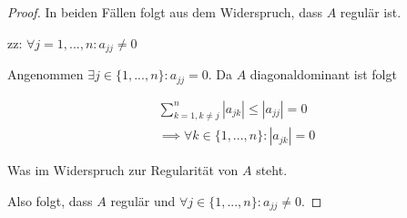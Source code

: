 \documentclass[]{article}
\begin{document}
\begin{proof}
	In beiden Fällen folgt aus dem Widerspruch, dass $A$ regulär ist.
	
	zz: $\forall j=1, ..., n: a_{jj}\neq 0$
	
	Angenommen $\exists j\in \{1, ..., n\}: a_{jj} = 0$. Da $A$ diagonaldominant ist folgt
	
	\begin{align*}
		\sum_{k=1,k\neq j}^{n}|a_{jk}| \leq |a_{jj}| = 0\\
		\implies \forall k\in\{1, ..., n\}: |a_{jk}| = 0
	\end{align*}

	Was im Widerspruch zur Regularität von $A$ steht.
	
	Also folgt, dass $A$ regulär und $\forall j\in\{1,...,n\}:a_{jj}\neq 0$.
\end{proof}
\newpage
\end{document}
